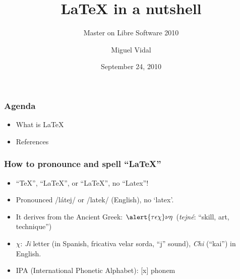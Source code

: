\documentclass{beamer}
\begin{document}
\title{LaTeX in a nutshell}
\subtitle{Master on Libre Software 2010}
\author{Miguel Vidal} 
\date{September 24, 2010}



\begin{frame}
  \frametitle{Agenda}

  \begin{itemize}
    \item What is LaTeX
    \item References
  \end{itemize}

\end{frame}




\begin{frame}
\frametitle{How to pronounce and spell ``LaTeX''}

\begin{itemize}

\item ``\TeX'', ``\LaTeX'', or ``LaTeX'', no ``Latex''!
\item Pronounced /látej/ or /latek/ (English), no `latex'. 
\item It derives from the Ancient Greek: $\alert{\tau\epsilon\chi}\nu\eta$ (\textit{\alert{tej}né}: ``skill, art, technique'')
\item $\chi$: \textit{Ji} letter (in Spanish, fricativa velar sorda, ``j'' sound), \textit{Chi} (``kai'') in English.
\item IPA (International Phonetic Alphabet): [x] phonem 
\end{itemize}

\end{frame}
\end{document}
